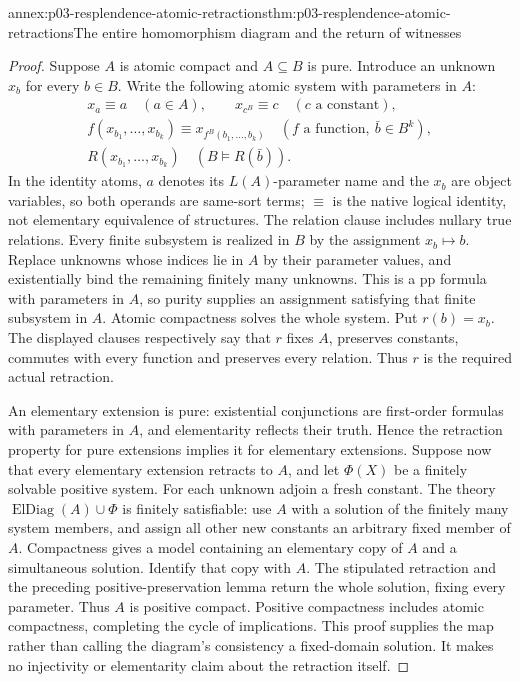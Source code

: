 \begin{annexitem}{annex:p03-resplendence-atomic-retractions}{thm:p03-resplendence-atomic-retractions}{The entire homomorphism diagram and the return of witnesses}
\begin{proof}
Suppose \(A\) is atomic compact and \(A\subseteq B\) is pure.
Introduce an unknown \(x_b\) for every \(b\in B\). Write the following
atomic system with parameters in \(A\):
\[
\begin{gathered}
 x_a\equiv a\quad(a\in A),\qquad x_{c^B}\equiv c\quad(c\text{ a constant}),\\
 f(x_{b_1},\ldots,x_{b_k})\equiv x_{f^B(b_1,\ldots,b_k)}
                          \quad(f\text{ a function},\ \bar b\in B^k),\\
 R(x_{b_1},\ldots,x_{b_k})\quad
                          (B\models R(\bar b)).
\end{gathered}
\]
In the identity atoms, \(a\) denotes its \(L(A)\)-parameter name
and the \(x_b\) are object variables, so both operands are same-sort
terms; \(\equiv\) is the native logical identity, not elementary
equivalence of structures. The relation clause includes nullary true
relations. Every finite subsystem is realized in \(B\) by the
assignment \(x_b\mapsto b\). Replace unknowns whose
indices lie in \(A\) by their parameter values, and existentially bind
the remaining finitely many unknowns. This is a pp formula with parameters
in \(A\), so purity supplies an assignment satisfying that finite
subsystem in \(A\). Atomic compactness solves the whole system. Put
\(r(b)=x_b\). The displayed clauses respectively say that \(r\) fixes
\(A\), preserves constants, commutes with every function and preserves
every relation. Thus \(r\) is the required actual retraction.

An elementary extension is pure: existential conjunctions are first-order
formulas with parameters in \(A\), and elementarity reflects their truth.
Hence the retraction property for pure extensions implies it for elementary
extensions. Suppose now that every elementary extension retracts to
\(A\), and let \(\Phi(X)\) be a finitely solvable positive system.
For each unknown adjoin a fresh constant. The theory
\(\operatorname{ElDiag}(A)\cup\Phi\) is finitely satisfiable: use
\(A\) with a solution of the finitely many system members, and assign
all other new constants an arbitrary fixed member of \(A\).
Compactness gives a model containing an elementary copy of \(A\) and
a simultaneous solution. Identify that copy with \(A\). The stipulated
retraction and the preceding positive-preservation lemma return the whole
solution, fixing every parameter. Thus \(A\) is positive compact.
Positive compactness includes atomic compactness, completing the cycle
of implications. This proof supplies the map rather than calling the
diagram's consistency a fixed-domain solution. It makes no injectivity
or elementarity claim about the retraction itself.
\end{proof}
\end{annexitem}

